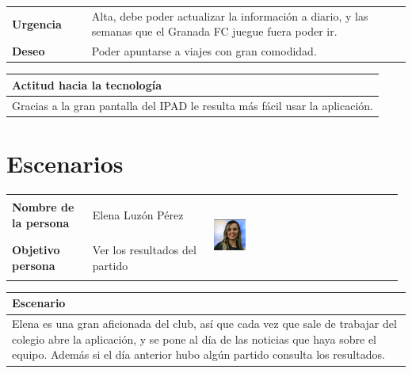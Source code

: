\documentclass[11pt]{article}
\begin{document}
\begin{table}[H]
  \begin{tabular}{p{0.2\linewidth}|p{0.8\linewidth}}
    \toprule
    \textbf{Urgencia} & Alta, debe poder actualizar la información a diario, y las semanas que el Granada FC juegue fuera poder ir.\\
    \textbf{Deseo}  & Poder apuntarse a viajes con gran comodidad.\\
    \bottomrule
  \end{tabular}

  \begin{tabular}{p{1.028\linewidth}}
    \textbf{Actitud hacia la tecnología}\\
    \midrule
    Gracias a la gran pantalla del IPAD le resulta más fácil usar la aplicación.
  \end{tabular}
\end{table}


\section{Escenarios}
\begin{table}[H]
  \centering
  \begin{tabular}{p{0.2\linewidth}|p{0.3\linewidth}p{0.475\linewidth}}
    \toprule
    \textbf{Nombre de la persona} & Elena Luzón Pérez &\multirow{2}{*}{\begin{minipage}{1.\textwidth}\includegraphics[width=0.18\textwidth, height=26mm]{Elena}\end{minipage}}\\
    \textbf{Objetivo persona} & Ver los resultados del partido & \\
    \bottomrule
  \end{tabular}

\begin{tabular}{p{1.028\linewidth}}
  \textbf{Escenario}\\
  \midrule
  Elena es una gran aficionada del club, así que cada vez que sale de trabajar del colegio abre la aplicación, y se pone al día de las noticias que haya sobre el equipo. Además si el día anterior hubo algún partido consulta los resultados.
\end{tabular}
\end{table}
\end{document}

